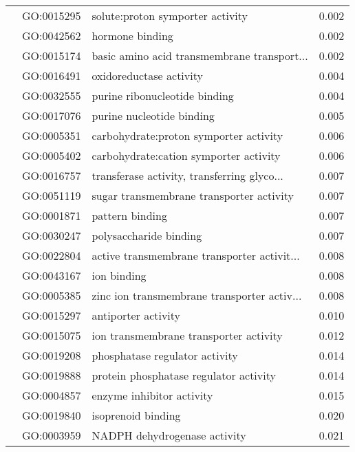 \begin{longtable}{lllr}
   & GO:0015295 &             solute:proton symporter activity &         0.002 \\
   & GO:0042562 &                              hormone binding &         0.002 \\
   & GO:0015174 &  basic amino acid transmembrane transport... &         0.002 \\
   & GO:0016491 &                      oxidoreductase activity &         0.004 \\
   & GO:0032555 &                purine ribonucleotide binding &         0.004 \\
   & GO:0017076 &                    purine nucleotide binding &         0.005 \\
   & GO:0005351 &       carbohydrate:proton symporter activity &         0.006 \\
   & GO:0005402 &       carbohydrate:cation symporter activity &         0.006 \\
   & GO:0016757 &  transferase activity, transferring glyco... &         0.007 \\
   & GO:0051119 &     sugar transmembrane transporter activity &         0.007 \\
   & GO:0001871 &                              pattern binding &         0.007 \\
   & GO:0030247 &                       polysaccharide binding &         0.007 \\
   & GO:0022804 &  active transmembrane transporter activit... &         0.008 \\
   & GO:0043167 &                                  ion binding &         0.008 \\
   & GO:0005385 &  zinc ion transmembrane transporter activ... &         0.008 \\
   & GO:0015297 &                          antiporter activity &         0.010 \\
   & GO:0015075 &       ion transmembrane transporter activity &         0.012 \\
   & GO:0019208 &               phosphatase regulator activity &         0.014 \\
   & GO:0019888 &       protein phosphatase regulator activity &         0.014 \\
   & GO:0004857 &                    enzyme inhibitor activity &         0.015 \\
   & GO:0019840 &                           isoprenoid binding &         0.020 \\
   & GO:0003959 &                 NADPH dehydrogenase activity &         0.021 \\

\end{longtable}

